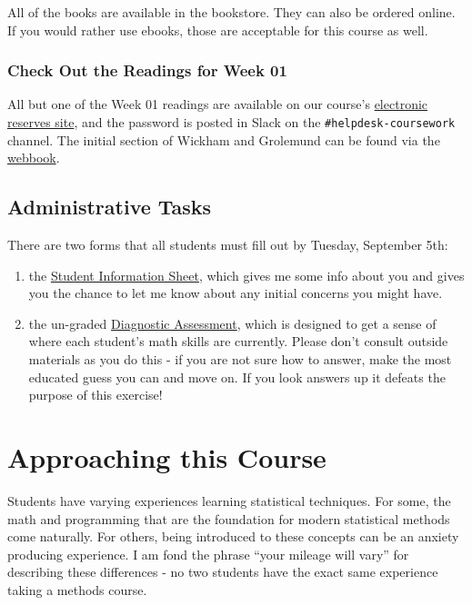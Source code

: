 \documentclass[]{book}
\theoremstyle{definition}
\theoremstyle{definition}
\theoremstyle{remark}
\begin{document}
All of the books are available in the bookstore. They can also be
ordered online. If you would rather use ebooks, those are acceptable for
this course as well.

\subsection{Check Out the Readings for Week
01}\label{check-out-the-readings-for-week-01}

All but one of the Week 01 readings are available on our course's
\href{http://eres.slu.edu/eres/coursepass.aspx?cid=4487}{electronic
reserves site}, and the password is posted in Slack on the
\texttt{\#helpdesk-coursework} channel. The initial section of Wickham
and Grolemund can be found via the
\href{http://r4ds.had.co.nz}{webbook}.

\section{Administrative Tasks}\label{administrative-tasks}

There are two forms that all students must fill out by Tuesday,
September 5th:

\begin{enumerate}
\def\labelenumi{\arabic{enumi}.}
\item
  the \href{https://goo.gl/forms/HddqLWd00qz6Qs903}{Student Information
  Sheet}, which gives me some info about you and gives you the chance to
  let me know about any initial concerns you might have.
\item
  the un-graded \href{https://goo.gl/forms/EgVGaUWu8mys2yBr2}{Diagnostic
  Assessment}, which is designed to get a sense of where each student's
  math skills are currently. Please don't consult outside materials as
  you do this - if you are not sure how to answer, make the most
  educated guess you can and move on. If you look answers up it defeats
  the purpose of this exercise!
\end{enumerate}

\chapter{Approaching this Course}\label{approaching-this-course}

Students have varying experiences learning statistical techniques. For
some, the math and programming that are the foundation for modern
statistical methods come naturally. For others, being introduced to
these concepts can be an anxiety producing experience. I am fond the
phrase ``your mileage will vary'' for describing these differences - no
two students have the exact same experience taking a methods course.
\end{document}
